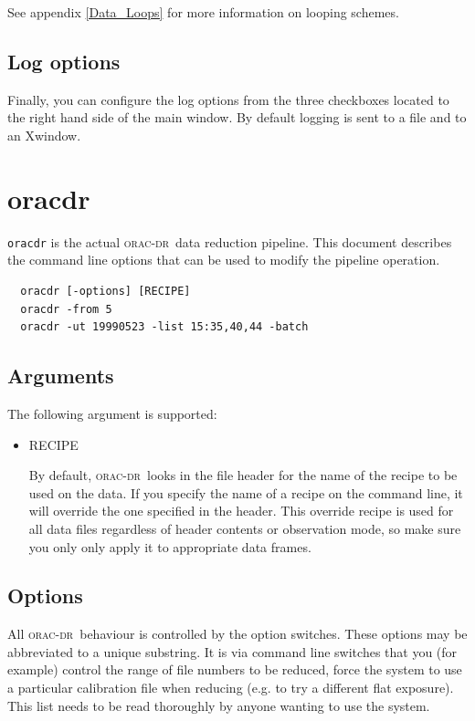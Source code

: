 \documentclass[twoside,11pt]{article}
\newcommand{\xlabel}[1]{}
\renewcommand{\_}{\texttt{\symbol{95}}}
\newcommand{\oracdr}{\textsc{orac-dr}}
\begin{document}
See appendix \ref{Data_Loops} for more information on looping
schemes.

\subsection*{Log options\label{Xoracdr_LOG_OPTIONS}}

Finally, you can configure the log options from the three checkboxes
located to the right hand side of the main window. By default logging
is sent to a file and to an Xwindow.

\section{oracdr\label{oracdr}\xlabel{oracdr}}

\texttt{oracdr} is the actual \oracdr\ data reduction pipeline. 
This document describes the command line options that
can be used to modify the pipeline operation.

\begin{verbatim}
  oracdr [-options] [RECIPE]
  oracdr -from 5
  oracdr -ut 19990523 -list 15:35,40,44 -batch
\end{verbatim}

\subsection*{Arguments\label{oracdr_Arguments}}

The following argument  is  supported:

\begin{itemize}
\item RECIPE

By default, \oracdr\ looks in the file header for the name of the
recipe to be used on the data. If you specify the name of a recipe on
the command line, it will override the one specified in the
header. This override recipe is used for all data files regardless of
header contents or observation mode, so make sure you only only apply
it to appropriate data frames.

\end{itemize}
\subsection*{Options\label{oracdr_Options}}

All \oracdr\ behaviour is controlled by the option
switches. These options may be abbreviated to a unique substring. It
is via command line switches that you (for example) control the range
of file numbers to be reduced, force the system to use a particular
calibration file when reducing (e.g. to try a different flat
exposure). This list needs to be read thoroughly by anyone wanting to
use the system.
\end{document}
